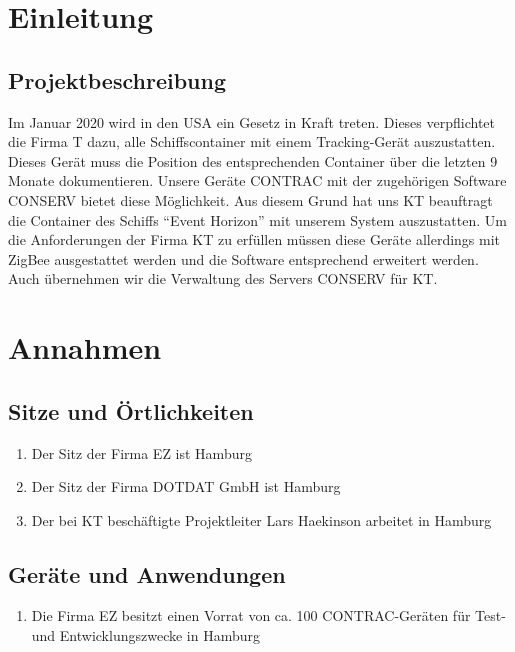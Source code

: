 %
%
%
%
%
%
%
%
%


\section{Einleitung}
\subsection{Projektbeschreibung}
Im Januar 2020 wird in den USA ein Gesetz in Kraft treten. Dieses verpflichtet die Firma T dazu, alle Schiffscontainer mit einem Tracking-Gerät auszustatten. Dieses Gerät muss die Position des entsprechenden Container über die letzten 9 Monate dokumentieren. Unsere Geräte CONTRAC mit der zugehörigen Software CONSERV bietet diese Möglichkeit. Aus diesem Grund hat uns KT beauftragt die Container des Schiffs "`Event Horizon"' mit unserem System auszustatten. Um die Anforderungen der Firma KT zu erfüllen müssen diese Geräte allerdings mit ZigBee ausgestattet werden und die Software entsprechend erweitert werden. Auch übernehmen wir die Verwaltung des Servers CONSERV für KT.
\section{Annahmen}
\subsection{Sitze und Örtlichkeiten}
\begin{enumerate}
    \item Der Sitz der Firma EZ ist Hamburg
    \item Der Sitz der Firma DOTDAT GmbH ist Hamburg
    \item Der bei KT beschäftigte Projektleiter Lars Haekinson arbeitet in Hamburg
\end{enumerate}

\subsection{Geräte und Anwendungen}
\begin{enumerate}
    \item Die Firma EZ besitzt einen Vorrat von ca. 100 CONTRAC-Geräten für Test- und Entwicklungszwecke in Hamburg
\end{enumerate}

